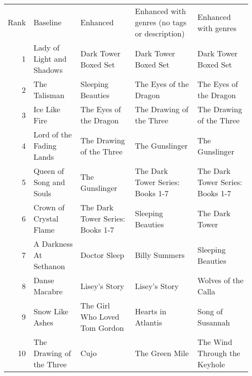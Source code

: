 \begin{tabular}{rllll}
Rank & Baseline & Enhanced & Enhanced with genres (no tags or description) & Enhanced with genres \\
1 & Lady of Light and Shadows & Dark Tower Boxed Set & Dark Tower Boxed Set & Dark Tower Boxed Set \\
2 & The Talisman & Sleeping Beauties & The Eyes of the Dragon & The Eyes of the Dragon \\
3 & Ice Like Fire & The Eyes of the Dragon & The Drawing of the Three & The Drawing of the Three \\
4 & Lord of the Fading Lands & The Drawing of the Three & The Gunslinger & The Gunslinger \\
5 & Queen of Song and Souls & The Gunslinger & The Dark Tower Series: Books 1-7 & The Dark Tower Series: Books 1-7 \\
6 & Crown of Crystal Flame & The Dark Tower Series: Books 1-7 & Sleeping Beauties & The Dark Tower \\
7 & A Darkness At Sethanon & Doctor Sleep & Billy Summers & Sleeping Beauties \\
8 & Danse Macabre & Lisey's Story & Lisey's Story & Wolves of the Calla \\
9 & Snow Like Ashes & The Girl Who Loved Tom Gordon & Hearts in Atlantis & Song of Susannah \\
10 & The Drawing of the Three & Cujo & The Green Mile & The Wind Through the Keyhole \\
\end{tabular}
